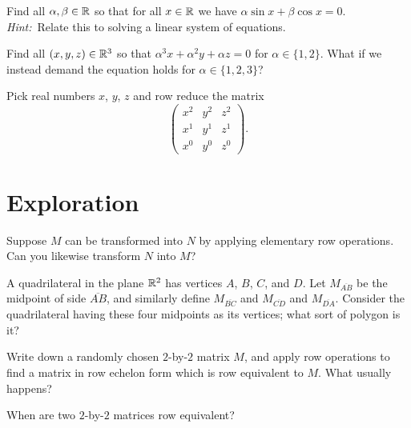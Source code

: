 \documentclass{homework}
\begin{document}
\begin{problem}
  Find all $\alpha, \beta \in \mathbb{R}$ so that for all $x \in \mathbb{R}$ we have $\alpha \sin x + \beta \cos x = 0$.  \textit{Hint:}~Relate this to solving a linear system of equations.
\end{problem}

\begin{problem}
  Find all $(x,y,z) \in \mathbb{R}^3$ so that $\alpha^3 x + \alpha^2 y + \alpha z = 0$ for $\alpha \in \{1,2\}$.  What if we instead demand the equation holds for $\alpha \in \{1,2,3\}$?
\end{problem}

\begin{problem}
  Pick real numbers $x$, $y$, $z$ and row reduce the matrix
  \[
    \begin{pmatrix}
      x^2 & y^2 & z^2 \\
      x^1 & y^1 & z^1 \\
      x^0 & y^0 & z^0            
    \end{pmatrix}.
  \]
\end{problem}

\section{Exploration}

\begin{problem}
  Suppose $M$ can be transformed into $N$ by applying elementary row
  operations.  Can you likewise transform $N$ into $M$?
\end{problem}

\begin{problem}
  A quadrilateral in the plane $\mathbb{R}^2$ has vertices $A$, $B$, $C$, and
  $D$.  Let $M_{\overline{AB}}$ be the midpoint of side
  $\overline{AB}$, and similarly define $M_{\overline{BC}}$ and
  $M_{\overline{CD}}$ and $M_{\overline{DA}}$.  Consider the
  quadrilateral having these four midpoints as its vertices; what sort
  of polygon is it?
\end{problem}

\begin{problem}
  Write down a randomly chosen $2$-by-$2$ matrix $M$, and apply row
  operations to find a matrix in row echelon form which is row
  equivalent to $M$.  What usually happens?
\end{problem}

\begin{problem}
  When are two $2$-by-$2$ matrices row equivalent?
\end{problem}
\end{document}
